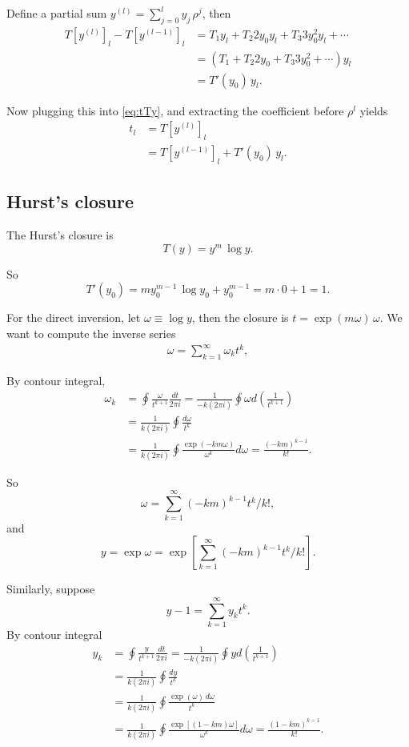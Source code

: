 \documentclass[aip,jcp,reprint,superscriptaddress]{revtex4-1}
\numberwithin{equation}{subsection}
\begin{document}
Define a partial sum $y^{(l)} = \sum_{j=0}^l y_j \, \rho^j$,
then
\begin{align*}
  T[y^{(l)}]_l - T[y^{(l-1)}]_l
&=
  T_1 y_l
+ T_2 2 y_0 y_l
+ T_3 3 y_0^2 y_l
+ \cdots
\\
&=
  (T_1
+ T_2 2 y_0
+ T_3 3 y_0^2
+ \cdots) y_l
\\
&= T'(y_0) \, y_l.
\end{align*}

Now plugging this into \eqref{eq:tTy},
and extracting the coefficient before $\rho^l$
yields
\begin{align*}
  t_l
&= T[y^{(l)}]_l
\\
&=
  T[y^{(l-1)}]_l + T'(y_0) \, y_l.
\end{align*}



\subsection{Hurst's closure}

The Hurst's closure is
\[
  T(y) = y^m \, \log y.
\]

So
\[
  T'(y_0)
  = m y_0^{m -1} \, \log y_0 + y_0^{m - 1}
  = m \cdot 0 + 1 = 1.
\]

For the direct inversion,
let $\omega \equiv \log y$,
then the closure is $t = \exp(m \omega) \, \omega$.
%
We want to compute the inverse series
\begin{align*}
  \omega = \sum_{k=1}^\infty \omega_k t^k,
\end{align*}

By contour integral,
\begin{align*}
\omega_k
&=
\oint \frac{\omega}{t^{k+1}} \frac{dt}{2\pi i}
=
\frac{1}{-k (2\pi i)} \oint \omega d\left(\frac{1}{t^{k+1}}\right)
\\
&=
\frac{1}{k (2\pi i)} \oint \frac{ d\omega }{t^{k}}
\\
&=
\frac{1}{k (2\pi i)} \oint \frac{ \exp( -k m\omega)  }{\omega^{k}} d\omega
=
\frac{ (-k m)^{k-1} }
     { k! }.
\end{align*}

So
\[
  \omega = \sum_{k=1}^\infty (-k m)^{k-1} t^k / k!,
\]
and
\[
  y
= \exp \omega
= \exp\left[ \sum_{k=1}^\infty (-k m)^{k-1} t^k / k! \right].
\]


Similarly, suppose
\[
  y - 1
=
\sum_{k = 1}^\infty y_k t^k.
\]
By contour integral
\begin{align*}
y_k
&=
\oint \frac{y}{t^{k+1}} \frac{dt}{2\pi i}
=
\frac{1}{-k (2\pi i)} \oint y d\left(\frac{1}{t^{k+1}}\right)
\\
&=
\frac{1}{k (2\pi i)} \oint \frac{ dy }{t^{k}}
\\
&=
\frac{1}{k (2\pi i)} \oint \frac{ \exp(\omega) \, d\omega }{t^{k}}
\\
&=
\frac{1}{k (2\pi i)} \oint \frac{ \exp[(1 - k m) \omega]  }{\omega^{k}} d\omega
=
\frac{ (1-k m)^{k-1} }
     { k! }.
\end{align*}
\end{document}
